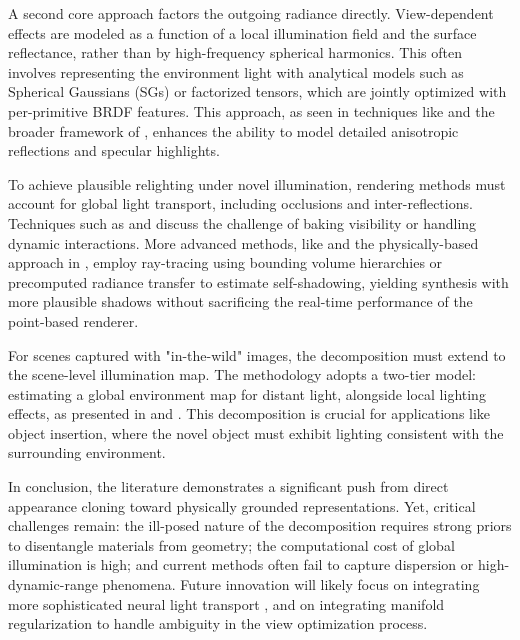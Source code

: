 \documentclass[11pt,a4paper]{article}
\begin{document}
A second core approach factors the outgoing radiance directly. View-dependent effects are modeled as a function of a local illumination field and the surface reflectance, rather than by high-frequency spherical harmonics. This often involves representing the environment light with analytical models such as Spherical Gaussians (SGs) or factorized tensors, which are jointly optimized with per-primitive BRDF features. This approach, as seen in techniques like \cite{arxiv:2402.15870v1} and the broader framework of \cite{arxiv:2308.04079v1}, enhances the ability to model detailed anisotropic reflections and specular highlights.

To achieve plausible relighting under novel illumination, rendering methods must account for global light transport, including occlusions and inter-reflections. Techniques such as \cite{arxiv:2404.10772v1} and \cite{arxiv:2401.15318v1} discuss the challenge of baking visibility or handling dynamic interactions. More advanced methods, like \cite{arxiv:2402.15870v1} and the physically-based approach in \cite{arxiv:2402.10483v1}, employ ray-tracing using bounding volume hierarchies or precomputed radiance transfer to estimate self-shadowing, yielding synthesis with more plausible shadows without sacrificing the real-time performance of the point-based renderer.

For scenes captured with "in-the-wild" images, the decomposition must extend to the scene-level illumination map. The methodology adopts a two-tier model: estimating a global environment map for distant light, alongside local lighting effects, as presented in \cite{arxiv:2403.15704v1} and \cite{arxiv:2403.16964v1}. This decomposition is crucial for applications like object insertion, where the novel object must exhibit lighting consistent with the surrounding environment.

In conclusion, the literature \cite{arxiv:2401.03890v2} \cite{arxiv:2403.11134v2} demonstrates a significant push from direct appearance cloning toward physically grounded representations. Yet, critical challenges remain: the ill-posed nature of the decomposition requires strong priors to disentangle materials from geometry; the computational cost of global illumination is high; and current methods often fail to capture dispersion or high-dynamic-range phenomena. Future innovation will likely focus on integrating more sophisticated neural light transport \cite{arxiv:2004.07484v3}, and on integrating manifold regularization to handle ambiguity in the view optimization process.
\end{document}
